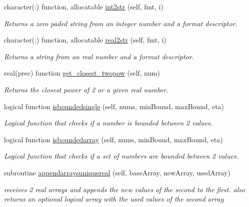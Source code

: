 \begin{DoxyCompactItemize}
character(\+:) function, allocatable \mbox{\hyperlink{namespaceutilities__mod_a6ba00b0a503f26c7e755d1efbbe83c5b}{int2str}} (self, fmt, i)
\begin{DoxyCompactList}\small\item\em Returns a zero paded string from an integer number and a format descriptor. \end{DoxyCompactList}\item 
character(\+:) function, allocatable \mbox{\hyperlink{namespaceutilities__mod_a2c8481f2b9f4cddf8391bd1e8b624335}{real2str}} (self, fmt, i)
\begin{DoxyCompactList}\small\item\em Returns a string from an real number and a format descriptor. \end{DoxyCompactList}\item 
real(prec) function \mbox{\hyperlink{namespaceutilities__mod_a164054d89c012d95f63c12a6cc0ac8d7}{get\+\_\+closest\+\_\+twopow}} (self, num)
\begin{DoxyCompactList}\small\item\em Returns the closest power of 2 or a given real number. \end{DoxyCompactList}\item 
logical function \mbox{\hyperlink{namespaceutilities__mod_a258d85bcc477041275bd954667168ea3}{isboundedsingle}} (self, nums, min\+Bound, max\+Bound, eta)
\begin{DoxyCompactList}\small\item\em Logical function that checks if a number is bounded between 2 values. \end{DoxyCompactList}\item 
logical function \mbox{\hyperlink{namespaceutilities__mod_a1d16eada2f4cb344ad1500b3edba43fa}{isboundedarray}} (self, nums, min\+Bound, max\+Bound, eta)
\begin{DoxyCompactList}\small\item\em Logical function that checks if a set of numbers are bounded between 2 values. \end{DoxyCompactList}\item 
subroutine \mbox{\hyperlink{namespaceutilities__mod_abffd01c3faf22f44e260c42c6f95d5c4}{appendarraysuniquereal}} (self, base\+Array, new\+Array, used\+Array)
\begin{DoxyCompactList}\small\item\em receives 2 real arrays and appends the new values of the second to the first. also returns an optional logical array with the used values of the second array \end{DoxyCompactList}\end{DoxyCompactItemize}
